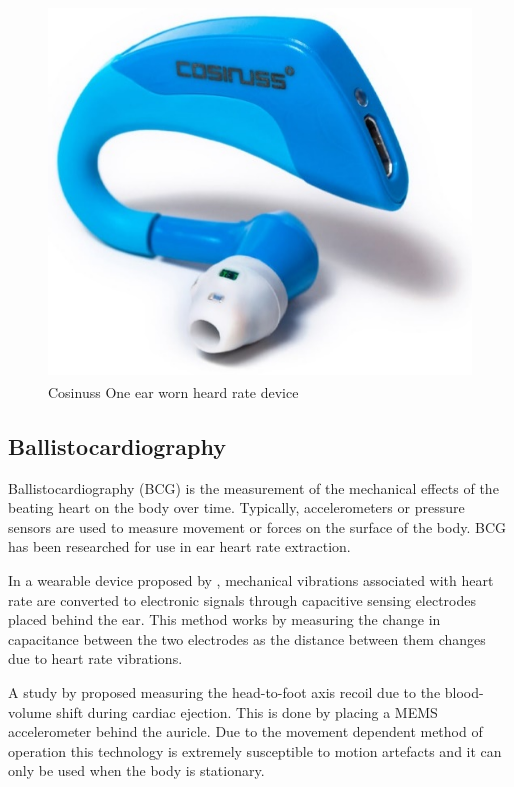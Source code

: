 \begin{figure}[h]
   \centering
   \includegraphics[scale=0.8]{figs/cosinuss}
   \caption{Cosinuss One\textsuperscript \textregistered{} ear worn heard rate device \citep{CosinussOne}}
   \label{fig:cosinuss}
\end{figure}


\subsection{Ballistocardiography}
Ballistocardiography (BCG) is the measurement of the mechanical effects of the beating heart on the body over time. Typically, accelerometers or pressure sensors are used to measure movement or forces on the surface of the body. BCG has been researched for use in ear heart rate extraction.

\medskip
In a wearable device proposed by \cite{da2010ear}, mechanical vibrations associated with heart rate are converted to electronic signals through capacitive sensing electrodes placed behind the ear. This method works by measuring the change in capacitance between the two electrodes as the distance between them changes due to heart rate vibrations.

\medskip
A study by \cite{winokur2012wearable} proposed measuring the head-to-foot axis recoil due to the blood-volume shift during cardiac ejection. This is done by placing a MEMS accelerometer behind the auricle. Due to the movement dependent method of operation this technology is extremely susceptible to motion artefacts and it can only be used when the body is stationary.

